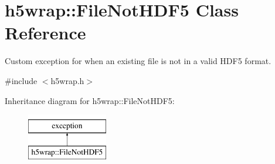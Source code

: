 \hypertarget{classh5wrap_1_1_file_not_h_d_f5}{\section{h5wrap\+:\+:File\+Not\+H\+D\+F5 Class Reference}
\label{classh5wrap_1_1_file_not_h_d_f5}
}


Custom exception for when an existing file is not in a valid H\+D\+F5 format.  




{\ttfamily \#include $<$h5wrap.\+h$>$}

Inheritance diagram for h5wrap\+:\+:File\+Not\+H\+D\+F5\+:\begin{figure}[H]
\begin{center}
\leavevmode
\includegraphics[height=2.000000cm]{classh5wrap_1_1_file_not_h_d_f5}
\end{center}
\end{figure}

